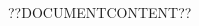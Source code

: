 \documentclass[11pt,final,twoside]{article}
\begin{document}
\begin{CJK}{UTF8}{gbsn}

??DOCUMENTCONTENT??

\end{CJK}
\end{document}
